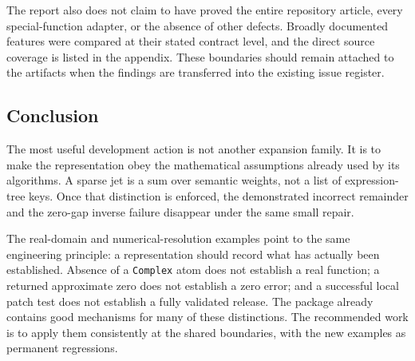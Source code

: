 \documentclass[11pt,letterpaper]{article}
\newcommand{\code}[1]{{\small\nolinkurl{#1}}}
\begin{document}
The report also does not claim to have proved the entire repository article, every special-function adapter, or the absence of other defects. Broadly documented features were compared at their stated contract level, and the direct source coverage is listed in the appendix. These boundaries should remain attached to the artifacts when the findings are transferred into the existing issue register.

\subsection{Conclusion}
The most useful development action is not another expansion family. It is to make the representation obey the mathematical assumptions already used by its algorithms. A sparse jet is a sum over semantic weights, not a list of expression-tree keys. Once that distinction is enforced, the demonstrated incorrect remainder and the zero-gap inverse failure disappear under the same small repair.

The real-domain and numerical-resolution examples point to the same engineering principle: a representation should record what has actually been established. Absence of a \code{Complex} atom does not establish a real function; a returned approximate zero does not establish a zero error; and a successful local patch test does not establish a fully validated release. The package already contains good mechanisms for many of these distinctions. The recommended work is to apply them consistently at the shared boundaries, with the new examples as permanent regressions.

\clearpage
\appendix
\end{document}
